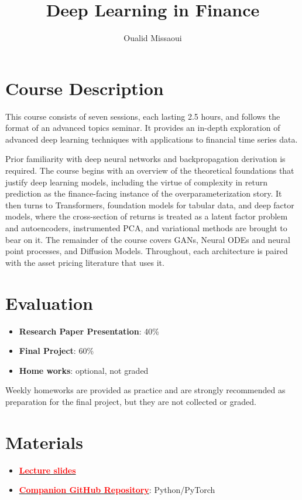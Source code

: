 \documentclass[11pt]{article}
\title{\textbf{Deep Learning in Finance}}
\author{Oualid Missaoui}
\date{}
\begin{document}
\maketitle

\section*{Course Description}

This course consists of seven sessions, each lasting 2.5 hours, and follows the
format of an advanced topics seminar. It provides an in-depth exploration of
advanced deep learning techniques with applications to financial time series
data.

Prior familiarity with deep neural networks and backpropagation derivation is
required. The course begins with an overview of the theoretical foundations
that justify deep learning models, including the virtue of complexity in return
prediction as the finance-facing instance of the overparameterization story. It
then turns to Transformers, foundation models for tabular data, and deep factor
models, where the cross-section of returns is treated as a latent factor problem
and autoencoders, instrumented PCA, and variational methods are brought to bear
on it. The remainder of the course covers GANs, Neural ODEs and neural
point processes, and Diffusion Models. Throughout, each architecture is paired
with the asset pricing literature that uses it.

\section*{Evaluation}

\begin{itemize}
  \item \textbf{Research Paper Presentation}: 40\%
  \item \textbf{Final Project}: 60\%
  \item \textbf{Home works}: optional, not graded
\end{itemize}

Weekly homeworks are provided as practice and are strongly recommended as
preparation for the final project, but they are not collected or graded.

\section*{Materials}

\begin{itemize}
  \item \href{https://github.com/omroot/DLinFinance-BaruchMFE2026/tree/main/lecture_slides}{\textcolor{red}{\textbf{Lecture slides}}}
  \item \href{https://github.com/omroot/DLinFinance-BaruchMFE2026/tree/main}{\textcolor{red}{\textbf{Companion GitHub Repository}}}: Python/PyTorch
\end{itemize}
\end{document}
